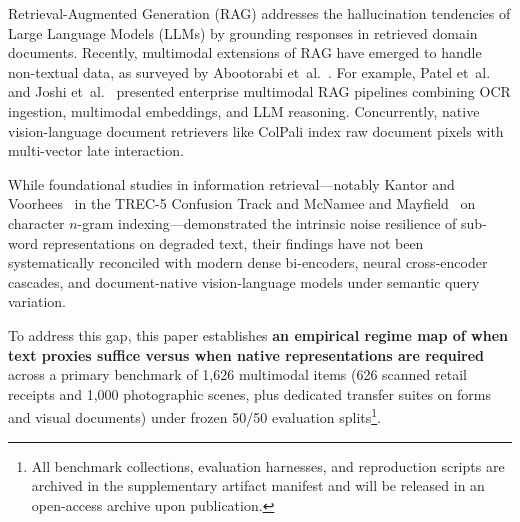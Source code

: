 Retrieval-Augmented Generation (RAG) \cite{lewis2020rag} addresses the hallucination tendencies of Large Language Models (LLMs) by grounding responses in retrieved domain documents. Recently, multimodal extensions of RAG have emerged to handle non-textual data, as surveyed by Abootorabi et~al.~\cite{abootorabi2025multimodal}. For example, Patel et~al.~\cite{patel2025multimodal} and Joshi et~al.~\cite{joshi2024multimodel} presented enterprise multimodal RAG pipelines combining OCR ingestion, multimodal embeddings, and LLM reasoning. Concurrently, native vision-language document retrievers like ColPali \cite{faysse2024colpali} index raw document pixels with multi-vector late interaction.

While foundational studies in information retrieval---notably Kantor and Voorhees~\cite{kantor2000confusion} in the TREC-5 Confusion Track and McNamee and Mayfield~\cite{mcnamee2004character} on character $n$-gram indexing---demonstrated the intrinsic noise resilience of sub-word representations on degraded text, their findings have not been systematically reconciled with modern dense bi-encoders, neural cross-encoder cascades, and document-native vision-language models under semantic query variation. 

To address this gap, this paper establishes \textbf{an empirical regime map of when text proxies suffice versus when native representations are required} across a primary benchmark of 1,626 multimodal items (626 scanned retail receipts and 1,000 photographic scenes, plus dedicated transfer suites on forms and visual documents) under frozen 50/50 evaluation splits\footnote{All benchmark collections, evaluation harnesses, and reproduction scripts are archived in the supplementary artifact manifest and will be released in an open-access archive upon publication.}.

